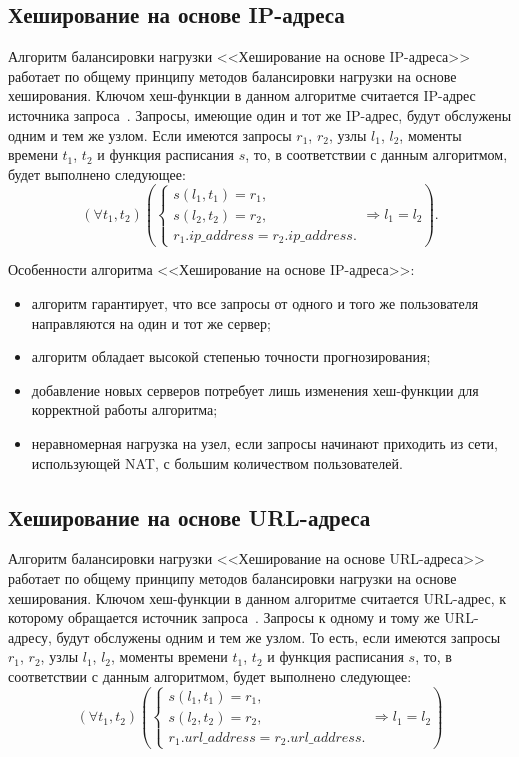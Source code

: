 \subsection*{Хеширование на основе IP-адреса}

Алгоритм балансировки нагрузки <<Хеширование на основе IP-адреса>> работает по общему принципу методов балансировки нагрузки на основе хеширования.
Ключом хеш-функции в данном алгоритме считается IP-адрес источника запроса~\cite{nginx, aws, kemp}.
Запросы, имеющие один и тот же IP-адрес, будут обслужены одним и тем же узлом.
Если имеются запросы $r_1$, $r_2$, узлы $l_1$, $l_2$, моменты времени $t_1$, $t_2$ и функция расписания $s$, то, в соответствии с данным алгоритмом, будет выполнено следующее:
\begin{equation}
	(\forall t_1, t_2) \left(\begin{cases}
		s(l_1, t_1) = r_1, \\
		s(l_2, t_2) = r_2, \\
		r_1.ip\_address = r_2.ip\_address.
	\end{cases} \Rightarrow l_1 = l_2 \right).
\end{equation}

Особенности алгоритма <<Хеширование на основе IP-адреса>>:
\begin{itemize}
	\item алгоритм гарантирует, что все запросы от одного и того же пользователя направляются на один и тот же сервер;
	\item алгоритм обладает высокой степенью точности прогнозирования;
	\item добавление новых серверов потребует лишь изменения хеш-функции для корректной работы алгоритма;
	\item неравномерная нагрузка на узел, если запросы начинают приходить из сети, использующей NAT, с большим количеством пользователей.
\end{itemize}

\subsection*{Хеширование на основе URL-адреса}

Алгоритм балансировки нагрузки <<Хеширование на основе URL-адреса>> работает по общему принципу методов балансировки нагрузки на основе хеширования.
Ключом хеш-функции в данном алгоритме считается URL-адрес, к которому обращается источник запроса~\cite{nginx, kemp, haproxy}.
Запросы к одному и тому же URL-адресу, будут обслужены одним и тем же узлом.
То есть, если имеются запросы $r_1$, $r_2$, узлы $l_1$, $l_2$, моменты времени $t_1$, $t_2$ и функция расписания $s$, то, в соответствии с данным алгоритмом, будет выполнено следующее:
\begin{equation}
	(\forall t_1, t_2) \left(\begin{cases}
		s(l_1, t_1) = r_1, \\
		s(l_2, t_2) = r_2, \\
		r_1.url\_address = r_2.url\_address.
	\end{cases} \Rightarrow l_1 = l_2 \right)
\end{equation}

